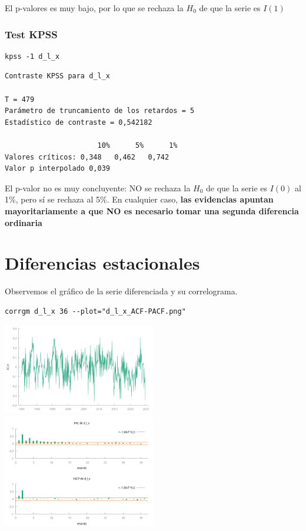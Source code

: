 \documentclass[10pt]{article}
\begin{document}
El p-valores es muy bajo, por lo que se rechaza la \(H_0\) de que la serie es \(I(1)\)
\subsubsection*{Test KPSS}
\label{sec:orgcd6f775}

\begin{verbatim}
kpss -1 d_l_x 
\end{verbatim}

\begin{verbatim}
Contraste KPSS para d_l_x

T = 479
Parámetro de truncamiento de los retardos = 5
Estadístico de contraste = 0,542182

                      10%      5%      1%
Valores críticos: 0,348   0,462   0,742
Valor p interpolado 0,039
\end{verbatim}

El p-valor no es muy concluyente: NO se rechaza la \(H_0\) de que la
serie es \(I(0)\) al 1\%, pero sí se rechaza al 5\%. En cualquier caso,
\textbf{las evidencias apuntan mayoritariamente a que NO es necesario tomar
una segunda diferencia ordinaria}
\section*{Diferencias estacionales}
\label{sec:org55f9a3a}

Observemos el gráfico de la serie diferenciada y su correlograma.

\begin{verbatim}
corrgm d_l_x 36 --plot="d_l_x_ACF-PACF.png"
\end{verbatim}


\begin{center}
\includegraphics[width=0.5\textwidth]{./EjercicioIdentificacionARIMA/SerieLogEnDiferencias.png}
\includegraphics[width=0.5\textwidth]{./EjercicioIdentificacionARIMA/d_l_x_ACF-PACF.png}
\end{center}
\end{document}
